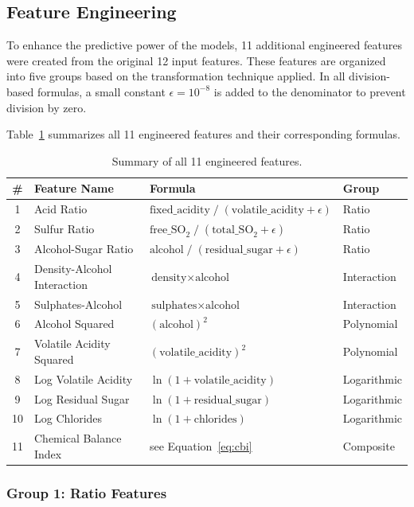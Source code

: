 \documentclass[12pt, a4paper]{article}
\begin{document}
\subsection{Feature Engineering}

To enhance the predictive power of the models, 11 additional engineered features were created from the original 12 input features. These features are organized into five groups based on the transformation technique applied. In all division-based formulas, a small constant $\epsilon = 10^{-8}$ is added to the denominator to prevent division by zero.

Table~\ref{tab:feature_formulas} summarizes all 11 engineered features and their corresponding formulas.

\begin{table}[H]
\centering
\caption{Summary of all 11 engineered features.}
\label{tab:feature_formulas}
\small
\begin{tabular}{clll}
\toprule
\textbf{\#} & \textbf{Feature Name} & \textbf{Formula} & \textbf{Group} \\
\midrule
1 & Acid Ratio & $\text{fixed\_acidity}\;/\;(\text{volatile\_acidity} + \epsilon)$ & Ratio \\
2 & Sulfur Ratio & $\text{free\_SO}_2\;/\;(\text{total\_SO}_2 + \epsilon)$ & Ratio \\
3 & Alcohol-Sugar Ratio & $\text{alcohol}\;/\;(\text{residual\_sugar} + \epsilon)$ & Ratio \\
4 & Density-Alcohol Interaction & $\text{density} \times \text{alcohol}$ & Interaction \\
5 & Sulphates-Alcohol & $\text{sulphates} \times \text{alcohol}$ & Interaction \\
6 & Alcohol Squared & $(\text{alcohol})^{2}$ & Polynomial \\
7 & Volatile Acidity Squared & $(\text{volatile\_acidity})^{2}$ & Polynomial \\
8 & Log Volatile Acidity & $\ln(1 + \text{volatile\_acidity})$ & Logarithmic \\
9 & Log Residual Sugar & $\ln(1 + \text{residual\_sugar})$ & Logarithmic \\
10 & Log Chlorides & $\ln(1 + \text{chlorides})$ & Logarithmic \\
11 & Chemical Balance Index & see Equation~\ref{eq:cbi} & Composite \\
\bottomrule
\end{tabular}
\end{table}

\subsubsection{Group 1: Ratio Features}
\end{document}
